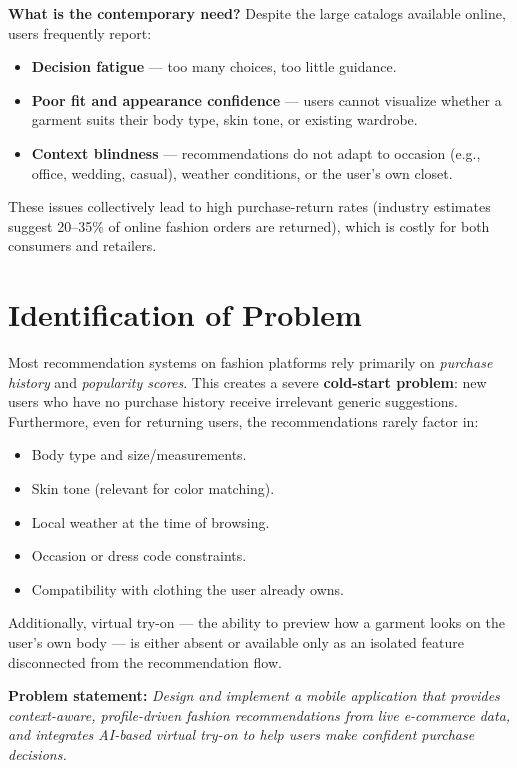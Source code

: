 \documentclass[12pt,a4paper]{report}
\begin{document}
\textbf{What is the contemporary need?} Despite the large catalogs available online, users frequently report:
\begin{itemize}
  \item \textbf{Decision fatigue} --- too many choices, too little guidance.
  \item \textbf{Poor fit and appearance confidence} --- users cannot visualize whether a garment suits their body type, skin tone, or existing wardrobe.
  \item \textbf{Context blindness} --- recommendations do not adapt to occasion (e.g., office, wedding, casual), weather conditions, or the user's own closet.
\end{itemize}

These issues collectively lead to high purchase-return rates (industry estimates suggest 20--35\% of online fashion orders are returned), which is costly for both consumers and retailers.

\section{Identification of Problem}

Most recommendation systems on fashion platforms rely primarily on \textit{purchase history} and \textit{popularity scores}. This creates a severe \textbf{cold-start problem}: new users who have no purchase history receive irrelevant generic suggestions. Furthermore, even for returning users, the recommendations rarely factor in:
\begin{itemize}
  \item Body type and size/measurements.
  \item Skin tone (relevant for color matching).
  \item Local weather at the time of browsing.
  \item Occasion or dress code constraints.
  \item Compatibility with clothing the user already owns.
\end{itemize}
Additionally, virtual try-on --- the ability to preview how a garment looks on the user's own body --- is either absent or available only as an isolated feature disconnected from the recommendation flow.

\textbf{Problem statement:} \textit{Design and implement a mobile application that provides context-aware, profile-driven fashion recommendations from live e-commerce data, and integrates AI-based virtual try-on to help users make confident purchase decisions.}
\end{document}
